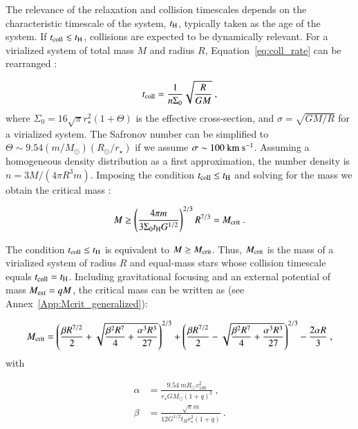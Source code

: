 The relevance of the relaxation and collision timescales depends on the characteristic timescale of the system, $t_{\rm H}$, typically taken as the age of the system. If $t_{\rm coll} \lesssim t_{\rm H}$, collisions are expected to be dynamically relevant. For a virialized system of total mass $M$ and radius $R$, Equation~\eqref{eq:coll_rate} can be rearranged \citep{escala2021observational}:

\begin{equation}
	\label{eq:tcoll_escala}
	t_{\rm coll} = \frac{1}{n \Sigma_0}\sqrt{\frac{R}{GM}}~,
\end{equation}
where $\Sigma_0=16\sqrt{\pi}r_{\star}^2(1+\Theta)$ is the effective cross-section, and $\sigma = \sqrt{GM/R}$ for a virialized system. The Safronov number can be simplified to $\Theta \sim 9.54 (m/M_{\odot})(R_{\odot}/r_{\star})$ if we assume $\sigma \sim 100~{\rm km}~{\rm s}^{-1}$. Assuming a homogeneous density distribution as a first approximation, the number density is $n=3M/(4\pi R^3m)$. Imposing the condition $t_{\rm coll} \leq t_{\rm H}$ and solving for the mass we obtain the critical mass \citep{escala2021observational,vergara2023global}:

\begin{equation}
	M \geq \left(\frac{4 \pi m}{3 \Sigma_0 t_{\rm H} G^{1/2}}\right)^{2/3} R^{7/3}=M_{\rm crit}~.
\end{equation}

The condition $t_{\rm coll} \leq t_{\rm H}$ is equivalent to $M \geq M_{\rm crit}$. Thus, $M_{\rm crit}$ is the mass of a virialized system of radius $R$ and equal-mass stars whose collision timescale equals $t_{\rm coll} = t_{\rm H}$. Including gravitational focusing and an external potential of mass $M_{\rm ext} = qM$, the critical mass can be written as (see Annex~\ref{App:Mcrit_generalized}):

\begin{equation}
	M_{\rm crit} = \left(\frac{\beta R^{7/2}}{2}+\sqrt{\frac{\beta^2 R^7}{4} + \frac{\alpha^3 R^3}{27}}\right)^{2/3} + \left(\frac{\beta R^{7/2}}{2}-\sqrt{\frac{\beta^2 R^7}{4} + \frac{\alpha^3 R^3}{27}}\right)^{2/3} - \frac{2\alpha R}{3}~,
	\label{eq:Mcrit_ext}
\end{equation}
with

\begin{align}
	\alpha &= \frac{9.54 ~ mR_\odot v_{100}^2}{r_\star G M_\odot (1+q)^2}~, \\
	\beta &= \frac{\sqrt{\pi} m}{12 G^{1/2}t_H r_\star^2 (1+q)}~. 
\end{align}

